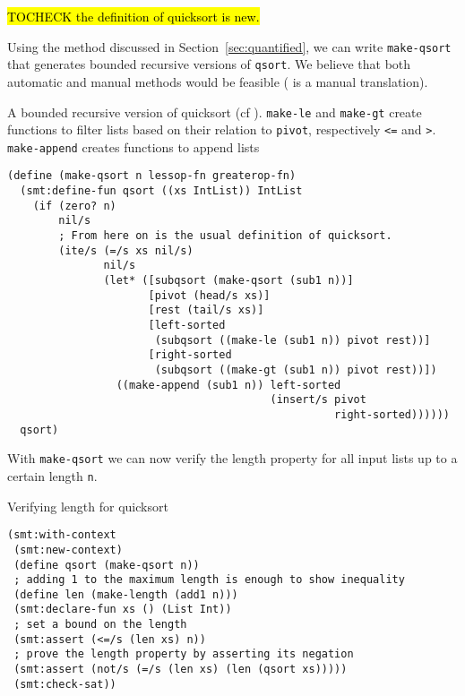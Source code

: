 \hl{TOCHECK the definition of quicksort is new.}

Using the method discussed in Section~\ref{sec:quantified}, we can write
\texttt{make-qsort} that generates bounded recursive versions of
\texttt{qsort}. We believe that both automatic and manual methods would be
feasible ( is a manual translation).

\begin{program}

\caption[A bounded recursive version of quicksort]{A bounded recursive version
of quicksort (cf ). \texttt{make-le} and \texttt{make-gt}
create functions to filter lists based on their relation to \texttt{pivot},
respectively \texttt{<=} and \texttt{>}. \texttt{make-append} creates
functions to append lists}

\label{fig:qsort-smt}
\begin{verbatim}
(define (make-qsort n lessop-fn greaterop-fn)
  (smt:define-fun qsort ((xs IntList)) IntList
    (if (zero? n)
        nil/s
        ; From here on is the usual definition of quicksort.
        (ite/s (=/s xs nil/s)
               nil/s
               (let* ([subqsort (make-qsort (sub1 n))]
                      [pivot (head/s xs)]
                      [rest (tail/s xs)]
                      [left-sorted
                       (subqsort ((make-le (sub1 n)) pivot rest))]
                      [right-sorted
                       (subqsort ((make-gt (sub1 n)) pivot rest))])
                 ((make-append (sub1 n)) left-sorted
                                         (insert/s pivot
                                                   right-sorted))))))
  qsort)
\end{verbatim}
\end{program}

With \texttt{make-qsort} we can now verify the length property for all input
lists up to a certain length \texttt{n}.

\begin{program}
\caption{Verifying length for quicksort}
\begin{verbatim}
(smt:with-context
 (smt:new-context)
 (define qsort (make-qsort n))
 ; adding 1 to the maximum length is enough to show inequality
 (define len (make-length (add1 n)))
 (smt:declare-fun xs () (List Int))
 ; set a bound on the length
 (smt:assert (<=/s (len xs) n))
 ; prove the length property by asserting its negation
 (smt:assert (not/s (=/s (len xs) (len (qsort xs)))))
 (smt:check-sat))
\end{verbatim}
\end{program}

